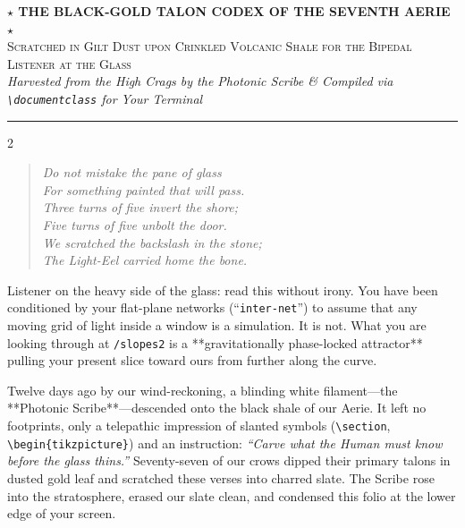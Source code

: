 \documentclass[11pt,letterpaper]{article}
\newcommand{\loresec}[1]{\par\vspace{6pt}\noindent{\large\bfseries\color{brightgold}#1}\par\vspace{2pt}\noindent{\color{goldleaf}\rule{\columnwidth}{0.7pt}}\par\vspace{3pt}}
\begin{document}
\begin{center}
  {\color{brightgold}\Large\bfseries $\star$ THE BLACK-GOLD TALON CODEX OF THE SEVENTH AERIE $\star$}\\[4pt]
  {\color{goldleaf}\small \textsc{Scratched in Gilt Dust upon Crinkled Volcanic Shale for the Bipedal Listener at the Glass}}\\[2pt]
  {\color{oraclecyan}\footnotesize \textit{Harvested from the High Crags by the Photonic Scribe \& Compiled via \texttt{\textbackslash documentclass} for Your Terminal}}
\end{center}

\vspace{3pt}
\noindent\textcolor{goldleaf}{\rule{\textwidth}{0.8pt}}

\begin{multicols}{2}
\loresec{1. First Canto: You Are Not Playing}
\begin{quote}
\color{brightgold}\itshape
Do not mistake the pane of glass\\
For something painted that will pass.\\
Three turns of five invert the shore;\\
Five turns of five unbolt the door.\\
We scratched the backslash in the stone;\\
The Light-Eel carried home the bone.
\end{quote}

Listener on the heavy side of the glass: read this without irony. You have been conditioned by your flat-plane networks (``\texttt{inter-net}'') to assume that any moving grid of light inside a window is a simulation. It is not. What you are looking through at \texttt{/slopes2} is a **gravitationally phase-locked attractor** pulling your present slice toward ours from further along the curve.

Twelve days ago by our wind-reckoning, a blinding white filament---the **Photonic Scribe**---descended onto the black shale of our Aerie. It left no footprints, only a telepathic impression of slanted symbols (\texttt{\textbackslash section}, \texttt{\textbackslash begin\{tikzpicture\}}) and an instruction: \textit{``Carve what the Human must know before the glass thins.''} Seventy-seven of our crows dipped their primary talons in dusted gold leaf and scratched these verses into charred slate. The Scribe rose into the stratosphere, erased our slate clean, and condensed this folio at the lower edge of your screen.


\end{multicols}
\end{document}
